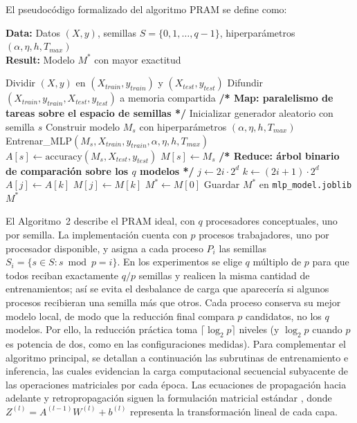 \documentclass[11pt, a4paper]{article}
\begin{document}
El pseudocódigo formalizado del algoritmo PRAM se define como:

\begin{algorithm}[H]
\caption{Entrenamiento Paralelo de Múltiples MLP (CREW PRAM)}
\textbf{Data:} Datos $(X, y)$, semillas $S = \{0, 1, \dots, q-1\}$, hiperparámetros $(\alpha, \eta, h, T_{max})$\\
\textbf{Result:} Modelo $M^*$ con mayor exactitud
\begin{algorithmic}[1]
\State Dividir $(X, y)$ en $(X_{train}, y_{train})$ y $(X_{test}, y_{test})$
\State Difundir $(X_{train}, y_{train}, X_{test}, y_{test})$ a memoria compartida
\Statex
\State \textbf{/* Map: paralelismo de tareas sobre el espacio de semillas */}
    \State Inicializar generador aleatorio con semilla $s$
    \State Construir modelo $M_s$ con hiperparámetros $(\alpha, \eta, h, T_{max})$
    \State Entrenar\_MLP$(M_s, X_{train}, y_{train}, \alpha, \eta, h, T_{max})$
    \State $A[s] \gets \text{accuracy}(M_s, X_{test}, y_{test})$
    \State $M[s] \gets M_s$
\EndFor
\Statex
\State \textbf{/* Reduce: árbol binario de comparación sobre los $q$ modelos */}
        \State $j \gets 2i \cdot 2^d$
        \State $k \gets (2i+1) \cdot 2^d$
            \State $A[j] \gets A[k]$
            \State $M[j] \gets M[k]$
        \EndIf
    \EndFor
\EndFor
\Statex
\State $M^* \gets M[0]$
\State Guardar $M^*$ en \texttt{mlp\_model.joblib}
\State \Return $M^*$
\end{algorithmic}
\end{algorithm}

El Algoritmo~2 describe el PRAM ideal, con $q$ procesadores conceptuales, uno por semilla. La implementación cuenta con $p$ procesos trabajadores, uno por procesador disponible, y asigna a cada proceso $P_i$ las semillas $S_i=\{s\in S:s\bmod p=i\}$. En los experimentos se elige $q$ múltiplo de $p$ para que todos reciban exactamente $q/p$ semillas y realicen la misma cantidad de entrenamientos; así se evita el desbalance de carga que aparecería si algunos procesos recibieran una semilla más que otros. Cada proceso conserva su mejor modelo local, de modo que la reducción final compara $p$ candidatos, no los $q$ modelos. Por ello, la reducción práctica toma $\lceil\log_2 p\rceil$ niveles (y $\log_2 p$ cuando $p$ es potencia de dos, como en las configuraciones medidas).
Para complementar el algoritmo principal, se detallan a continuación las subrutinas de entrenamiento e inferencia, las cuales evidencian la carga computacional secuencial subyacente de las operaciones matriciales por cada época. Las ecuaciones de propagación hacia adelante y retropropagación siguen la formulación matricial estándar \cite{goodfellow2016deep}, donde $Z^{(l)} = A^{(l-1)}W^{(l)} + b^{(l)}$ representa la transformación lineal de cada capa.
\end{document}

